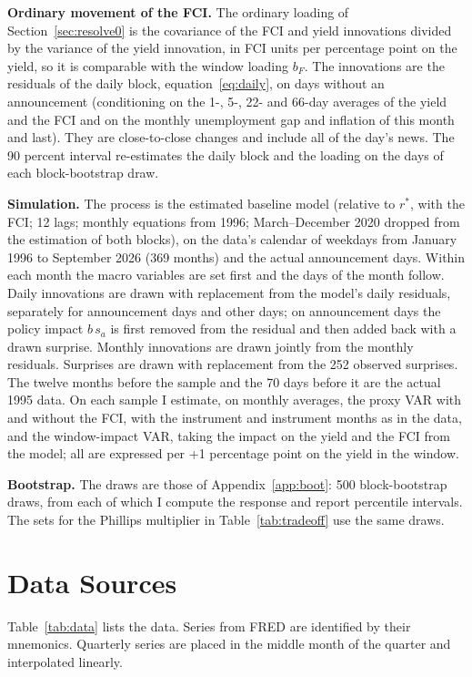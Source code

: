 \documentclass[11pt]{article}
\newcommand{\rs}{r^{*}}
\begin{document}
\begin{appendices}
\textbf{Ordinary movement of the FCI.} The ordinary loading of Section~\ref{sec:resolve0} is the covariance of the FCI and yield innovations divided by the variance of the yield innovation, in FCI units per percentage point on the yield, so it is comparable with the window loading $b_F$. The innovations are the residuals of the daily block, equation~\eqref{eq:daily}, on days without an announcement (conditioning on the 1-, 5-, 22- and 66-day averages of the yield and the FCI and on the monthly unemployment gap and inflation of this month and last). They are close-to-close changes and include all of the day's news. The 90 percent interval re-estimates the daily block and the loading on the days of each block-bootstrap draw.

\textbf{Simulation.} The process is the estimated baseline model (relative to $\rs$, with the FCI; 12 lags; monthly equations from 1996; March--December 2020 dropped from the estimation of both blocks), on the data's calendar of weekdays from January 1996 to September 2026 (369 months) and the actual announcement days. Within each month the macro variables are set first and the days of the month follow. Daily innovations are drawn with replacement from the model's daily residuals, separately for announcement days and other days; on announcement days the policy impact $b\,s_a$ is first removed from the residual and then added back with a drawn surprise. Monthly innovations are drawn jointly from the monthly residuals. Surprises are drawn with replacement from the 252 observed surprises. The twelve months before the sample and the 70 days before it are the actual 1995 data. On each sample I estimate, on monthly averages, the proxy VAR with and without the FCI, with the instrument and instrument months as in the data, and the window-impact VAR, taking the impact on the yield and the FCI from the model; all are expressed per +1 percentage point on the yield in the window.

\textbf{Bootstrap.} The draws are those of Appendix~\ref{app:boot}: 500 block-bootstrap draws, from each of which I compute the response and report percentile intervals. The sets for the Phillips multiplier in Table~\ref{tab:tradeoff} use the same draws.

\FloatBarrier
\section{Data Sources}\label{app:data}
Table~\ref{tab:data} lists the data. Series from FRED are identified by their mnemonics. Quarterly series are placed in the middle month of the quarter and interpolated linearly.


\end{appendices}
\end{document}
